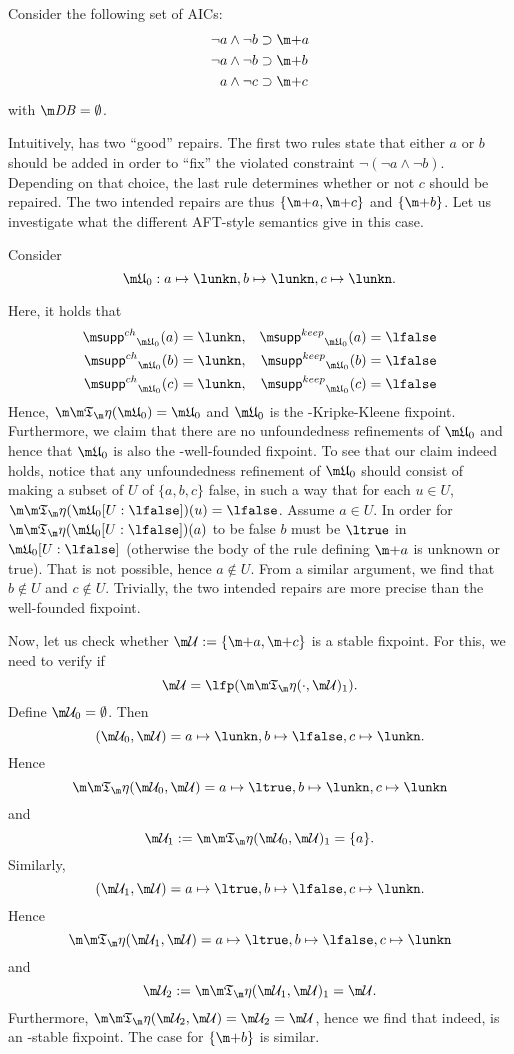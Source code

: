 \begin{example}
 Consider the following set \aics of AICs:
\begin{align*}
 \lnot a \land \lnot b&\aicrule \add a\\
 \lnot a \land \lnot b&\aicrule \add b\\
 a \land \lnot c &\aicrule \add c 
 \end{align*} with $\db = \emptyset$.
 
 Intuitively, \aics has two ``good'' repairs. The first two rules state that either $a$ or $b$ should be added in order to ``fix'' the violated constraint $\lnot (\lnot a \land \lnot b)$. 
 Depending on that choice, the last rule determines whether or not $c$ should be repaired.  The two intended repairs are thus $\{\add a,\add c\}$ and $\{\add b\}$. 
 Let us investigate what the different AFT-style semantics give in this case. 
 
 Consider 
\[\UUU_0: a\mapsto \lunkn, b\mapsto \lunkn, c\mapsto\lunkn.\]

Here, it holds that 
\begin{align*}
 \suppin_{\UUU_0}(a) &= \lunkn, & \suppout_{\UUU_0}(a) &=\lfalse \\
 \suppin_{\UUU_0}(b) &= \lunkn, & \suppout_{\UUU_0}(b) &=\lfalse \\
 \suppin_{\UUU_0}(c) &= \lunkn, & \suppout_{\UUU_0}(c) &=\lfalse 
\end{align*}
Hence, $\Ap(\UUU_0) = \UUU_0$ and $\UUU_0$ is the \Ap-Kripke-Kleene fixpoint. 
Furthermore, we claim that there are no unfoundedness refinements of $\UUU_0$ and hence that $\UUU_0$ is also the \Ap-well-founded fixpoint. To see that our claim indeed holds, notice that any unfoundedness refinement of $\UUU_0$ should consist of making a subset of $U$ of $\{a,b,c\}$ false, in such a way that for each $u\in U$, $\Ap(\UUU_0[U: \lfalse])(u)=\lfalse$. 
Assume $a\in U$. In order for $\Ap(\UUU_0[U: \lfalse])(a)$ to be false $b$ must be $\ltrue$ in $\UUU_0[U: \lfalse]$ (otherwise the body of the rule defining $\add a$ is unknown or true). That is not possible, hence $a\not \in U$. From a similar argument, we find that $b\not \in U$ and $c\not \in U$. 
Trivially, the two intended repairs are more precise than the well-founded fixpoint. 

Now, let us check whether $\UU := \{\add a, \add c\}$ is a stable fixpoint. 
For this, we need to verify if 
\[\UU =\lfp(\Ap(\cdot,\UU)_1).\]
Define $\UU_0=\emptyset$. Then 
\[(\UU_0,\UU) = a \mapsto \lunkn, b\mapsto \lfalse, c\mapsto \lunkn.\]
Hence 
\[\Ap(\UU_0,\UU) = a \mapsto \ltrue, b\mapsto \lunkn, c \mapsto \lunkn\]
and 
\[\UU_1 := \Ap(\UU_0,\UU)_1 = \{a\}.\]
Similarly, 
\[(\UU_1,\UU) = a \mapsto \ltrue, b\mapsto \lfalse, c\mapsto \lunkn.\]
Hence 
\[\Ap(\UU_1,\UU) = a \mapsto \ltrue, b\mapsto \lfalse, c \mapsto \lunkn\]
and 
\[\UU_2 := \Ap(\UU_1,\UU)_1 = \UU.\]
Furthermore, $\Ap(\UU_2,\UU) = \UU_2=\UU$, hence  we find that indeed, \UU is an \Ap-stable fixpoint. 
The case for $\{\add b\}$ is similar. 


\end{example}
